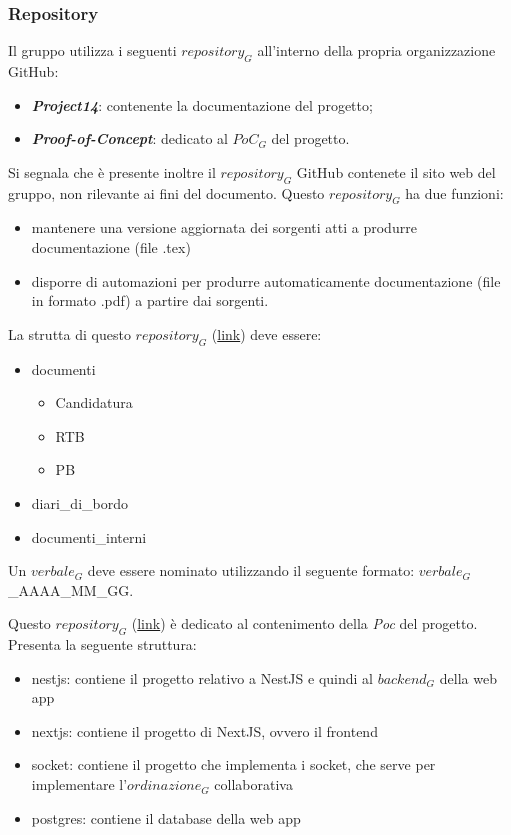 \subsubsection{Repository}
Il gruppo utilizza i seguenti $\textit{repository}_G$ all'interno della propria organizzazione GitHub:
\begin{itemize}
    \item \emph{\textbf{Project14}}: contenente la documentazione del progetto;
    \item \emph{\textbf{Proof-of-Concept}}: dedicato al $\textit{PoC}_G$ del progetto.
\end{itemize}
Si segnala che è presente inoltre il $\textit{repository}_G$ GitHub contenete il sito web del gruppo, non rilevante ai fini del documento.
Questo $\textit{repository}_G$ ha due funzioni:
\begin{itemize}
    \item mantenere una versione aggiornata dei sorgenti atti a produrre documentazione (file .tex)
    \item disporre di automazioni per produrre automaticamente documentazione (file in formato .pdf) a partire dai sorgenti.
\end{itemize}
La strutta di questo $\textit{repository}_G$ (\href{https://github.com/RAMtastic6/Project14}{link}) deve essere:
\begin{itemize}
    \item documenti
    \begin{itemize}
        \item Candidatura
        \item RTB
        \item PB
    \end{itemize}
    \item diari\_di\_bordo
    \item documenti\_interni
\end{itemize}
Un $\textit{verbale}_G$ deve essere nominato utilizzando il seguente formato: $\textit{verbale}_G$\_AAAA\_MM\_GG.

Questo $\textit{repository}_G$ (\href{https://github.com/RAMtastic6/Proof-of-Concept}{link}) è dedicato al contenimento della \textit{Poc} del progetto. \\
Presenta la seguente struttura:
\begin{itemize}
    \item nestjs: contiene il progetto relativo a NestJS e quindi al $\textit{backend}_G$ della web app
    \item nextjs: contiene il progetto di NextJS, ovvero il frontend
    \item socket: contiene il progetto che implementa i socket, che serve per implementare l'$\textit{ordinazione}_G$ collaborativa
    \item postgres: contiene il database della web app
\end{itemize}

